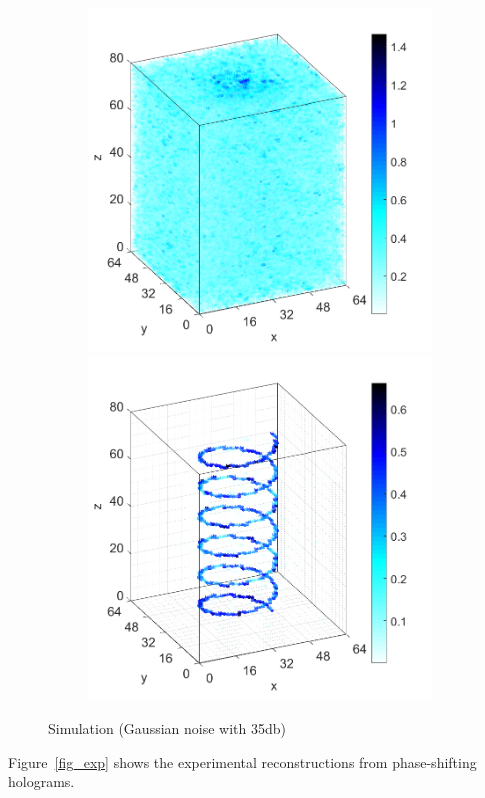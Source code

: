 \documentclass[9pt,twocolumn,twoside]{osajnl}
\begin{document}
\begin{figure}[H]
{\begin{subfigure}[b]{0.95\columnwidth}
\begin{minipage}[b]{0.13\columnwidth}
    \end{minipage}
    \includegraphics[width=0.27\columnwidth]{cirhelix_complex_BP_3d}
    \includegraphics[width=0.27\columnwidth]{cirhelix_complex_TwIST_3d}
    \caption{}
\end{subfigure}}
\caption{Simulation (Gaussian noise with 35db)}
\label{fig_sim}
\end{figure}

Figure~\ref{fig_exp} shows the experimental reconstructions from phase-shifting holograms.
\end{document}
